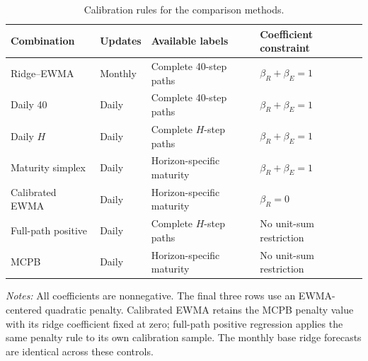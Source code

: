 \begin{table}[tbp]
\centering\small
\setlength{\tabcolsep}{4pt}
\renewcommand{\arraystretch}{1.12}
\caption{Calibration rules for the comparison methods.}
\label{tab:controls}
\begin{tabular}{llll}
\toprule
Combination & Updates & Available labels & Coefficient constraint \\
\midrule
Ridge--EWMA & Monthly & Complete 40-step paths & $\beta_R+\beta_E=1$ \\
Daily 40 & Daily & Complete 40-step paths & $\beta_R+\beta_E=1$ \\
Daily $H$ & Daily & Complete $H$-step paths & $\beta_R+\beta_E=1$ \\
Maturity simplex & Daily & Horizon-specific maturity & $\beta_R+\beta_E=1$ \\
Calibrated EWMA & Daily & Horizon-specific maturity & $\beta_R=0$ \\
Full-path positive & Daily & Complete $H$-step paths & No unit-sum restriction \\
MCPB & Daily & Horizon-specific maturity & No unit-sum restriction \\
\bottomrule
\end{tabular}
\par\smallskip
\begin{minipage}{0.98\linewidth}\footnotesize
\textit{Notes:} All coefficients are nonnegative. The final three rows use an EWMA-centered quadratic penalty. Calibrated EWMA retains the MCPB penalty value with its ridge coefficient fixed at zero; full-path positive regression applies the same penalty rule to its own calibration sample. The monthly base ridge forecasts are identical across these controls.
\end{minipage}
\end{table}
